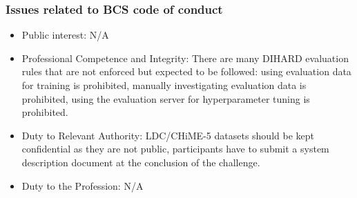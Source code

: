 	\subsubsection{Issues related to BCS code of conduct}
	\begin{itemize}
	\item Public interest: N/A
	\item Professional Competence and Integrity: There are many DIHARD evaluation rules that are not enforced but expected to be followed: using evaluation data for training is prohibited, manually investigating evaluation data is prohibited, using the evaluation server for hyperparameter tuning is prohibited.
	\item Duty to Relevant Authority: LDC/CHiME-5 datasets should be kept confidential as they are not public, participants have to submit a system description document at the conclusion of the challenge.
	\item Duty to the Profession: N/A
	\end{itemize}
	